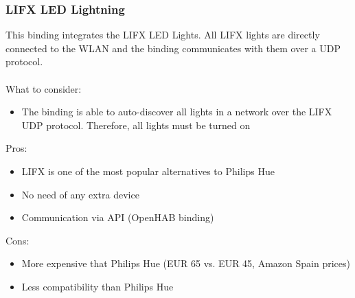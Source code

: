 \subsubsection{LIFX LED Lightning}
This binding integrates the LIFX LED Lights. All LIFX lights are directly connected to the WLAN and the binding communicates with
them over a UDP protocol.\\~\\
What to consider:
\begin{itemize}
	\item The binding is able to auto-discover all lights in a network over the LIFX UDP protocol. Therefore, all lights must be turned on
\end{itemize}
Pros:
\begin{itemize}
	\item LIFX is one of the most popular alternatives to Philips Hue
	\item No need of any extra device
	\item Communication via API (OpenHAB binding)
\end{itemize}
Cons:
\begin{itemize}
	\item More expensive that Philips Hue (EUR 65 vs. EUR 45, Amazon Spain prices)
	\item Less compatibility than Philips Hue
\end{itemize}

